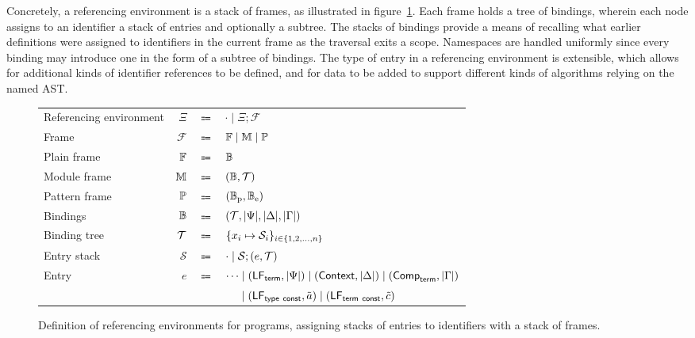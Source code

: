 Concretely, a referencing environment is a stack of frames, as illustrated in figure~\ref{figure:referencing-environment-definition}.
Each frame holds a tree of bindings, wherein each node assigns to an identifier a stack of entries and optionally a subtree.
The stacks of bindings provide a means of recalling what earlier definitions were assigned to identifiers in the current frame as the traversal exits a scope.
Namespaces are handled uniformly since every binding may introduce one in the form of a subtree of bindings.
The type of entry in a referencing environment is extensible, which allows for additional kinds of identifier references to be defined, and for data to be added to support different kinds of algorithms relying on the named \ac{AST}.

\begin{figure}[H]
\centering
{\footnotesize
\begin{tabular}{lrcl}
Referencing environment & $\Xi$ & $\Coloneqq$ & $ \cdot \mid \Xi; \mathcal{F} $\\
Frame & $ \mathcal{F} $ & $ \Coloneqq $ & $ \mathbb{F} \mid \mathbb{M} \mid \mathbb{P} $\\
Plain frame & $ \mathbb{F} $ & $ \Coloneqq $ & $ \mathbb{B} $\\
Module frame & $ \mathbb{M} $ & $ \Coloneqq $ & $ (\mathbb{B}, \mathcal{T}) $\\
Pattern frame & $ \mathbb{P} $ & $ \Coloneqq $ & $ (\mathbb{B}_{\text{p}}, \mathbb{B}_{\text{e}}) $\\
Bindings & $ \mathbb{B} $ & $ \Coloneqq $ & $ (\mathcal{T}, |\Psi|, |\Delta|, |\Gamma|) $\\
Binding tree & $ \mathcal{T} $ & $ \Coloneqq $ & $ \{x_i \mapsto \mathcal{S}_i\}_{i \in \{1, 2, \dots, n\}} $\\
Entry stack & $ \mathcal{S} $ & $ \Coloneqq $ & $ \cdot \mid \mathcal{S}; (e, \mathcal{T}) $\\
Entry & $ e $ & $ \Coloneqq $ & $ \cdots \mid (\mathsf{LF}_{\mathsf{term}}, |\Psi|) \mid (\mathsf{Context}, |\Delta|) \mid (\mathsf{Comp}_{\mathsf{term}}, |\Gamma|) $\\
&&& $ \phantom{\cdots} \mid (\mathsf{LF}_{\mathsf{type\ const}}, \tilde a) \mid (\mathsf{LF}_{\mathsf{term\ const}}, \tilde c) $
\end{tabular}
}
\caption[Definition of referencing environments for \Beluga programs]{%
Definition of referencing environments for \Beluga programs, assigning stacks of entries to identifiers with a stack of frames.
}
\label{figure:referencing-environment-definition}
\end{figure}

